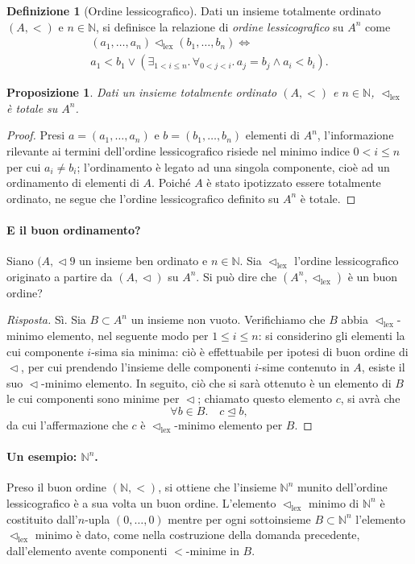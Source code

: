 \documentclass[fontsize = 11 pt, paper=A4, oneside, index=totoc, hyperref]{article}
\theoremstyle{definition}
\newtheorem{dfn}{Definizione}[section]
\theoremstyle{plain}
\newtheorem{prp}{Proposizione}[section]
\newcommand{\N}{\mathbb{N}}
\newcommand{\order}{\vartriangleleft}
\newcommand{\ordine}[1]{\vartriangleleft_{\mathrm{#1}}}
\begin{document}
\begin{dfn}[Ordine lessicografico]
  Dati un insieme totalmente ordinato \((A,<)\) e \(n \in \N\), si definisce la relazione di \emph{ordine lessicografico} su \(A^n\) come
  \begin{multline}
    (a_1,\dots,a_n) \ordine{lex} (b_1,\dots,b_n) \iff \\ a_1 < b_1 \lor \left( \exists_{1 < i \le n}.\, \forall_{0 < j < i}.\, a_j = b_j \land a_i < b_i\right).
  \end{multline}
\end{dfn}
\begin{prp}
  Dati un insieme totalmente ordinato \((A, <)\) e \(n \in \N\), \(\ordine{lex}\) è totale su \(A^n\).
\end{prp}
\begin{proof}
  Presi \(a = (a_1,\dots,a_n)\) e \(b = (b_1,\dots,b_n)\) elementi di \(A^n\), l'informazione rilevante ai termini dell'ordine lessicografico risiede nel minimo indice \(0 < i \le n\) per cui \(a_i \neq b_i\); l'ordinamento è legato ad una singola componente, cioè ad un ordinamento di elementi di \(A\). Poiché \(A\) è stato ipotizzato essere totalmente ordinato, ne segue che l'ordine lessicografico definito su \(A^n\) è totale.
\end{proof}

\paragraph{E il buon ordinamento?} Siano \((A,\order9\) un insieme ben ordinato e \(n \in \N\). Sia \(\ordine{lex}\) l'ordine lessicografico originato a partire da \((A,\order)\) su \(A^n\). Si può dire che \((A^n,\ordine{lex})\) è un buon ordine?
\begin{proof}[Risposta]
  Sì. Sia \(B \subset A^n\) un insieme non vuoto. Verifichiamo che \(B\) abbia \(\ordine{lex}\)-minimo elemento, nel seguente modo per \(1 \le i \le n\): si considerino gli elementi la cui componente \(i\)-sima sia minima: ciò è effettuabile per ipotesi di buon ordine di \(\order\), per cui prendendo l'insieme delle componenti \(i\)-sime contenuto in \(A\), esiste il suo \(\order\)-minimo elemento. In seguito, ciò che si sarà ottenuto è un elemento di \(B\) le cui componenti sono minime per \(\order\); chiamato questo elemento \(c\), si avrà che
  \[
  \forall b \in B.\quad c \trianglelefteq b,
  \]
  da cui l'affermazione che \(c\) è \(\ordine{lex}\)-minimo elemento per \(B\).
\end{proof}
\paragraph{Un esempio: \(\N^n\).} Preso il buon ordine \((\N, <)\), si ottiene che l'insieme \(\N^n\) munito dell'ordine lessicografico è a sua volta un buon ordine. L'elemento \(\ordine{lex}\) minimo di \(\N^n\) è costituito dall'\(n\)-upla \((0,\dots,0)\) mentre per ogni sottoinsieme \(B \subset \N^n\) l'elemento \(\ordine{lex}\) minimo è dato, come nella costruzione della domanda precedente, dall'elemento avente componenti \(<\)-minime in \(B\).
\end{document}
